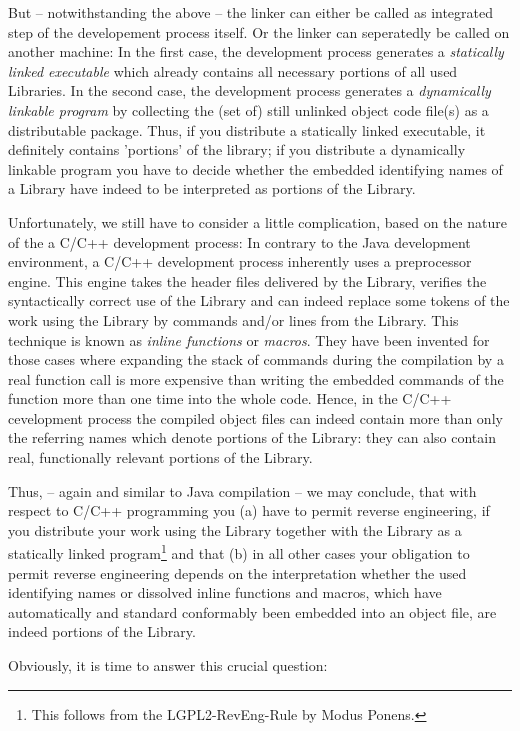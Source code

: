 But -- notwithstanding the above -- the linker can either be called as
integrated step of the developement process itself. Or the linker can
seperatedly be called on another machine: In the first case, the development
process generates a \emph{statically linked executable} which already contains
all necessary portions of all used Libraries. In the second case, the
development process generates a \emph{dynamically linkable program} by
collecting the (set of) still unlinked object code file(s) as a distributable
package. Thus, if you distribute a statically linked executable, it definitely
contains 'portions' of the library; if you distribute a dynamically linkable
program you have to decide whether the embedded identifying names of a Library
have indeed to be interpreted as portions of the Library.

Unfortunately, we still have to consider a little complication, based on the
nature of the a C/C++ development process: In contrary to the Java development
environment, a C/C++ development process inherently uses a preprocessor engine.
This engine takes the header files delivered by the Library, verifies the
syntactically correct use of the Library and can indeed replace some tokens of
the work using the Library by commands and/or lines from the Library. This
technique is known as \emph{inline functions} or \emph{macros}. They have been
invented for those cases where expanding the stack of commands during the
compilation by a real function call is more expensive than writing the embedded
commands of the function more than one time into the whole code. Hence, in the
C/C++ cevelopment process the compiled object files can indeed contain more than
only the referring names which denote portions of the Library: they can also
contain real, functionally relevant portions of the Library.
 
Thus, -- again and similar to Java compilation -- we may conclude, that with
respect to C/C++ programming you (a) have to permit reverse engineering, if you
distribute your work using the Library together with the Library as a statically
linked program\footnote{This follows from the LGPL2-RevEng-Rule by Modus
Ponens.} and that (b) in all other cases your obligation to permit reverse
engineering depends on the interpretation whether the used identifying names or
dissolved inline functions and macros, which have automatically and standard
conformably been embedded into an object file, are indeed portions of the
Library.

Obviously, it is time to answer this crucial question:

